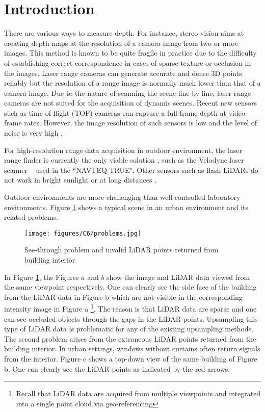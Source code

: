 \section{Introduction}

There are various ways to measure depth. For instance, stereo vision aims at creating depth maps at the resolution of a camera image from two or more images. This method is known to be quite fragile in practice due to the difficulty of establishing correct correspondence in cases of sparse texture or occlusion in the images. Laser range cameras can generate accurate and dense 3D points reliably but the resolution of a range image is normally much lower than that of a camera image. Due to the nature of scanning the scene line by line, laser range cameras are not suited for the acquisition of dynamic scenes. Recent new sensors such as time of flight (TOF) cameras can capture a full frame depth at video frame rates. However, the image resolution of such sensors is low and the level of noise is very high \cite{yang07}. 

For high-resolution range data acquisition in outdoor environment, the laser range finder is currently the only viable solution \cite{Dolson10}, such as the Velodyne laser scanner ~\cite {velodyne-url} used in the ``NAVTEQ TRUE". Other sensors such as flash LiDARs do not work in bright sunlight or at long distances \cite{Dolson10}.

Outdoor environments are more challenging than well-controlled laboratory environments. Figure \ref{fig:C6:problems} shows a typical scene in an urban environment and its related problems.  

\begin{figure}[H]
\centering
\texttt{[image: figures/C6/problems.jpg]} \\
\caption{See-through problem and invalid LiDAR points returned from building interior} 
\label{fig:C6:problems}
\end{figure}

In Figure \ref{fig:C6:problems}, the Figures $a$ and $b$ show the image and LiDAR data viewed from the same viewpoint respectively. One can clearly see the side face of the building from the LiDAR data in Figure b which are not visible in the corresponding intensity image in Figure a \footnote{Recall that LiDAR data are acquired from multiple viewpoints and integrated into a single point cloud via geo-referencing}. The reason is that LiDAR data are sparse and one can see occluded objects through the gaps in the LiDAR points. Upsampling this type of LiDAR data is problematic for any of the existing upsampling methods. The second problem arises from the extraneous LiDAR points returned from the building interior. In urban settings, windows without curtains often return signals from the interior. Figure c shows a top-down view of the same building of Figure b. One can clearly see the LiDAR points as indicated by the red arrows. 

